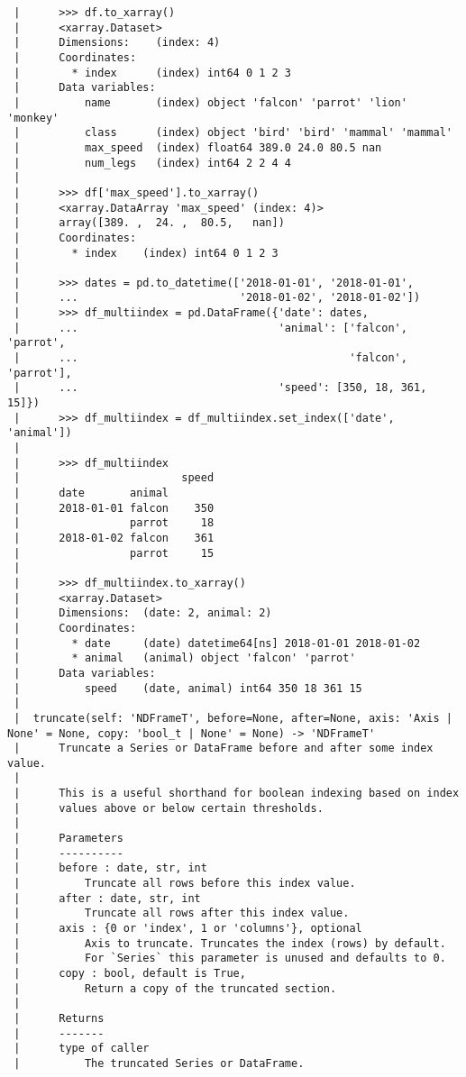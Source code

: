 \documentclass[
  letterpaper,
  DIV=11,
  numbers=noendperiod]{scrreprt}
\begin{document}
\begin{verbatim}
 |      >>> df.to_xarray()
 |      <xarray.Dataset>
 |      Dimensions:    (index: 4)
 |      Coordinates:
 |        * index      (index) int64 0 1 2 3
 |      Data variables:
 |          name       (index) object 'falcon' 'parrot' 'lion' 'monkey'
 |          class      (index) object 'bird' 'bird' 'mammal' 'mammal'
 |          max_speed  (index) float64 389.0 24.0 80.5 nan
 |          num_legs   (index) int64 2 2 4 4
 |      
 |      >>> df['max_speed'].to_xarray()
 |      <xarray.DataArray 'max_speed' (index: 4)>
 |      array([389. ,  24. ,  80.5,   nan])
 |      Coordinates:
 |        * index    (index) int64 0 1 2 3
 |      
 |      >>> dates = pd.to_datetime(['2018-01-01', '2018-01-01',
 |      ...                         '2018-01-02', '2018-01-02'])
 |      >>> df_multiindex = pd.DataFrame({'date': dates,
 |      ...                               'animal': ['falcon', 'parrot',
 |      ...                                          'falcon', 'parrot'],
 |      ...                               'speed': [350, 18, 361, 15]})
 |      >>> df_multiindex = df_multiindex.set_index(['date', 'animal'])
 |      
 |      >>> df_multiindex
 |                         speed
 |      date       animal
 |      2018-01-01 falcon    350
 |                 parrot     18
 |      2018-01-02 falcon    361
 |                 parrot     15
 |      
 |      >>> df_multiindex.to_xarray()
 |      <xarray.Dataset>
 |      Dimensions:  (date: 2, animal: 2)
 |      Coordinates:
 |        * date     (date) datetime64[ns] 2018-01-01 2018-01-02
 |        * animal   (animal) object 'falcon' 'parrot'
 |      Data variables:
 |          speed    (date, animal) int64 350 18 361 15
 |  
 |  truncate(self: 'NDFrameT', before=None, after=None, axis: 'Axis | None' = None, copy: 'bool_t | None' = None) -> 'NDFrameT'
 |      Truncate a Series or DataFrame before and after some index value.
 |      
 |      This is a useful shorthand for boolean indexing based on index
 |      values above or below certain thresholds.
 |      
 |      Parameters
 |      ----------
 |      before : date, str, int
 |          Truncate all rows before this index value.
 |      after : date, str, int
 |          Truncate all rows after this index value.
 |      axis : {0 or 'index', 1 or 'columns'}, optional
 |          Axis to truncate. Truncates the index (rows) by default.
 |          For `Series` this parameter is unused and defaults to 0.
 |      copy : bool, default is True,
 |          Return a copy of the truncated section.
 |      
 |      Returns
 |      -------
 |      type of caller
 |          The truncated Series or DataFrame.

\end{verbatim}
\end{document}
